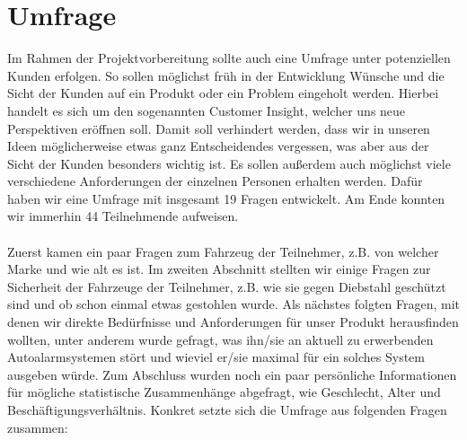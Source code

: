 
\section{Umfrage}
Im Rahmen der Projektvorbereitung sollte auch eine Umfrage unter potenziellen Kunden erfolgen. So sollen möglichst früh in der Entwicklung Wünsche und die Sicht der Kunden auf ein Produkt oder ein Problem eingeholt werden. Hierbei handelt es sich um den sogenannten Customer Insight, welcher uns neue Perspektiven eröffnen soll. Damit soll verhindert werden, dass wir in unseren Ideen möglicherweise etwas ganz Entscheidendes vergessen, was aber aus der Sicht der Kunden besonders wichtig ist. Es sollen außerdem auch möglichst viele verschiedene Anforderungen der einzelnen Personen erhalten werden. Dafür haben wir eine Umfrage mit insgesamt 19 Fragen entwickelt. Am Ende konnten wir immerhin 44 Teilnehmende aufweisen.
\\
\\
Zuerst kamen ein paar Fragen zum Fahrzeug der Teilnehmer, z.B. von welcher Marke und wie alt es ist. Im zweiten Abschnitt stellten wir einige Fragen zur Sicherheit der Fahrzeuge der Teilnehmer, z.B. wie sie gegen Diebstahl geschützt sind und ob schon einmal etwas gestohlen wurde. Als nächstes folgten Fragen, mit denen wir direkte Bedürfnisse und Anforderungen für unser Produkt herausfinden wollten, unter anderem wurde gefragt, was ihn/sie an aktuell zu erwerbenden Autoalarmsystemen stört und wieviel er/sie maximal für ein solches System ausgeben würde. Zum Abschluss wurden noch ein paar persönliche Informationen für mögliche statistische Zusammenhänge abgefragt, wie Geschlecht, Alter und Beschäftigungsverhältnis.
Konkret setzte sich die Umfrage aus folgenden Fragen zusammen:

